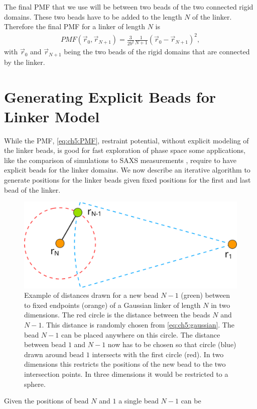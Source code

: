 \documentclass[12pt, twoside]{report}
\begin{document}
The final \gls{PMF} that we use will be between two beads of the two connected
rigid domains. These two beads have to be added to the length \(N\) of the
linker. Therefore the final \gls{PMF} for a linker of length \(N\) is
\begin{align}
  \label{eq:ch5:PMF-complexes} PMF(\vec{r}_0, \vec{r}_{N+1}) = \frac{3}{2 b^2}
\frac{1}{N+1} (\vec{r}_0 - \vec{r}_{N+1})^2,
\end{align} with \(\vec{r}_0\) and \(\vec{r}_{N+1}\) being the two beads of the
rigid domains that are connected by the linker.

\section{Generating Explicit Beads for Linker Model}

While the PMF, \cref{eq:ch5:PMF}, restraint potential, without explicit modeling
of the linker beads, is good for fast exploration of phase space some
applications, like the comparison of simulations to \gls{SAXS} measurements
\cite{Kofinger2015, Rozycki2011}, require to have explicit beads for the linker
domains. We now describe an iterative algorithm to generate positions for the
linker beads given fixed positions for the first and last bead of the linker.
\begin{figure}[!ht]
  \centering
\includegraphics[width=\linewidth]{figures/gaussian_chain_move}
\caption[Illustration of generating bead distances for a Gaussian polymer
model.]{Example of distances drawn for a new bead $N-1$ (green) between to fixed
  endpoints (orange) of a Gaussian linker of length $N$ in two dimensions. The
  red circle is the distance between the beads $N$ and $N - 1$. This distance is
  randomly chosen from \cref{eq:ch5:gaussian}. The bead $N-1$ can be placed
  anywhere on this circle. The distance between bead $1$ and $N-1$ now has to be
  chosen so that circle (blue) drawn around bead $1$ intersects with the first
  circle (red). In two dimensions this restricts the positions of the new bead
  to the two intersection points. In three dimensions it would be restricted to
  a sphere. }
\label{fig:algorithm}
\end{figure} Given the positions of bead $N$ and $1$ a single bead $N-1$ can be
\end{document}
